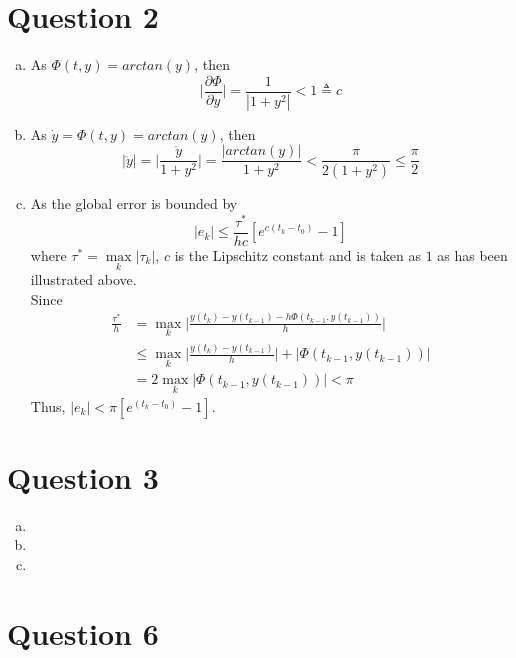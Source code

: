 \documentclass[paper=a4, fontsize=11pt]{scrartcl} %
\numberwithin{equation}{section} %
\numberwithin{figure}{section} %
\numberwithin{table}{section} %
\begin{document}
\section{Question 2}
	\begin{enumerate}[(a)]
		\item 
			As $\Phi(t, y) = arctan(y)$, then
			\begin{equation}
				\Bigg| \frac{\partial \Phi}{\partial y} \Bigg| = \frac{1}{|1+y^2|} < 1 \triangleq c
			\end{equation}
		\item 
			As $\dot{y} = \Phi(t, y) = arctan(y)$, then
			\begin{equation}
				|\ddot{y}| = \Bigg| \frac{\dot{y}}{1+y^2} \Bigg| = \frac{|arctan(y)|}{1+y^2} < \frac{\pi}{2(1+y^2)} \leq \frac{\pi}{2} 
			\end{equation}
		\item 
			As the global error is bounded by
			\begin{equation}
				|e_k| \leq \frac{\tau^*}{hc}[e^{c(t_k - t_0)} - 1]
			\end{equation}
			where $\tau^* = \max\limits_{k}|\tau_k|$, $c$ is the Lipschitz constant and is taken as $1$ as has been illustrated above.\\
			Since 
			\begin{equation}
				\begin{aligned}
					\frac{\tau^*}{h} & = \max\limits_{k}\Bigg|\frac{y(t_k) - y(t_{k-1}) - h\Phi(t_{k-1}, y(t_{k-1}))}{h}\Bigg|\\
									 & \leq \max\limits_{k}\Bigg| \frac{y(t_k) - y(t_{k-1})}{h}\Bigg| + |\Phi(t_{k-1}, y(t_{k-1}))|\\
									 & = 2 \max\limits_{k} |\Phi(t_{k-1}, y(t_{k-1}))| < \pi
				\end{aligned}
			\end{equation}
			Thus, $|e_k| < \pi[e^{(t_k - t_0)}-1]$.
	\end{enumerate}

\section{Question 3}
	\begin{enumerate}[(a)]
		\item 
		
		\item 
		
		\item 
		
	\end{enumerate}

\section{Question 6}
\end{document}

